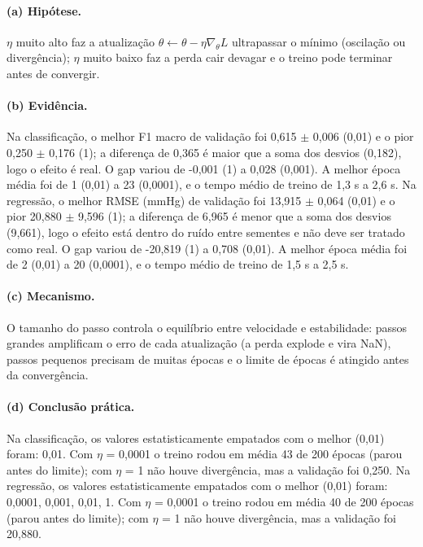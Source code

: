 \documentclass[11pt,a4paper]{article}
\begin{document}
\paragraph{(a) Hipótese.} $\eta$ muito alto faz a atualização $\theta \leftarrow \theta - \eta\nabla_\theta L$ ultrapassar o mínimo (oscilação ou divergência); $\eta$ muito baixo faz a perda cair devagar e o treino pode terminar antes de convergir.

\paragraph{(b) Evidência.} Na classificação, o melhor F1 macro de validação foi 0,615 $\pm$ 0,006 (0,01) e o pior 0,250 $\pm$ 0,176 (1); a diferença de 0,365 é maior que a soma dos desvios (0,182), logo o efeito é real. O gap variou de -0,001 (1) a 0,028 (0,001). A melhor época média foi de 1 (0,01) a 23 (0,0001), e o tempo médio de treino de 1,3 s a 2,6 s. Na regressão, o melhor RMSE (mmHg) de validação foi 13,915 $\pm$ 0,064 (0,01) e o pior 20,880 $\pm$ 9,596 (1); a diferença de 6,965 é menor que a soma dos desvios (9,661), logo o efeito está dentro do ruído entre sementes e não deve ser tratado como real. O gap variou de -20,819 (1) a 0,708 (0,01). A melhor época média foi de 2 (0,01) a 20 (0,0001), e o tempo médio de treino de 1,5 s a 2,5 s.

\paragraph{(c) Mecanismo.} O tamanho do passo controla o equilíbrio entre velocidade e estabilidade: passos grandes amplificam o erro de cada atualização (a perda explode e vira NaN), passos pequenos precisam de muitas épocas e o limite de épocas é atingido antes da convergência.

\paragraph{(d) Conclusão prática.} Na classificação, os valores estatisticamente empatados com o melhor (0,01) foram: 0,01. Com $\eta$ = 0,0001 o treino rodou em média 43 de 200 épocas (parou antes do limite); com $\eta$ = 1 não houve divergência, mas a validação foi 0,250. Na regressão, os valores estatisticamente empatados com o melhor (0,01) foram: 0,0001, 0,001, 0,01, 1. Com $\eta$ = 0,0001 o treino rodou em média 40 de 200 épocas (parou antes do limite); com $\eta$ = 1 não houve divergência, mas a validação foi 20,880.
\end{document}
